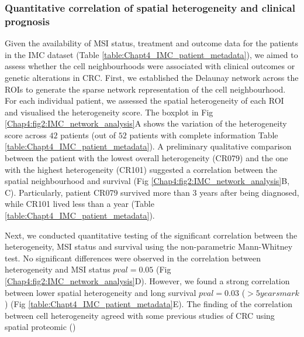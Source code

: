 \subsubsection{Quantitative correlation of spatial heterogeneity and clinical prognosis}
Given the availability of MSI status, treatment and outcome data for the patients in the IMC dataset (Table \ref{table:Chapt4_IMC_patient_metadata}), we aimed to assess whether the cell neighbourhoods were associated with clinical outcomes or genetic alterations in CRC. First, we established the Delaunay network across the ROIs to generate the sparse network representation of the cell neighbourhood. For each individual patient, we assessed the spatial heterogeneity of each ROI and visualised the heterogeneity score. The boxplot in Fig \ref{Chap4:fig2:IMC_network_analysis}A shows the variation of the heterogeneity score across $42$ patients (out of $52$ patients with complete information Table \ref{table:Chapt4_IMC_patient_metadata}). A preliminary qualitative comparison between the patient with the lowest overall heterogeneity (CR079) and the one with the highest heterogeneity (CR101) suggested a correlation between the spatial neighbourhood and survival (Fig \ref{Chap4:fig2:IMC_network_analysis}B, C). Particularly, patient CR079 survived more than 3 years after being diagnosed, while CR101 lived less than a year (Table \ref{table:Chapt4_IMC_patient_metadata}). 

Next, we conducted quantitative testing of the significant correlation between the heterogeneity, MSI status and survival using the non-parametric Mann-Whitney test. No significant differences were observed in the correlation between heterogeneity and MSI status $pval=0.05$ (Fig \ref{Chap4:fig2:IMC_network_analysis}D). However, we found a strong correlation between lower spatial heterogeneity and long survival $pval=0.03$ ($>5 years mark$) (Fig \ref{table:Chapt4_IMC_patient_metadata}E). The finding of the correlation between cell heterogeneity agreed with some previous studies of CRC using spatial proteomic (\cite{schurch2020coordinated, li2017reference})             

